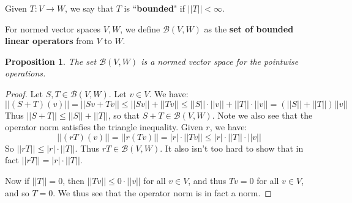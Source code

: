 \documentclass[a4paper,12pt]{report}
\newcommand{\ms}[1]{\mathscr{#1}}
\newtheorem{prop}[theorem]{Proposition}
\newenvironment{definition}[1][Definition.]{\begin{trivlist}
\item[\hskip \labelsep {\bfseries #1}]}{\end{trivlist}}
\begin{document}
	\begin{definition}
	Given $T : V \rightarrow W$, we say that $T$ is ``\textbf{bounded}" if $||T|| < \infty$. 
	\end{definition}
	
	\begin{definition}
	For normed vector spaces $V, W$, we define $\ms{B}(V, W)$ as the \textbf{set of bounded linear operators} from $V$ to $W$.
	\end{definition}
	
	\begin{prop}
	The set $\ms{B}(V, W)$ is a normed vector space for the pointwise operations. 
	\end{prop}
	\begin{proof}
	Let $S, T \in \ms{B}(V, W)$. Let $v \in V$. We have:
	\[ ||(S + T)(v)|| = ||Sv + Tv|| \leq ||Sv|| + ||Tv|| \leq ||S|| \cdot ||v|| + ||T|| \cdot ||v|| = (||S|| + ||T||)||v|| \]
	Thus $||S + T|| \leq ||S|| + ||T||$, so that $S + T \in \ms{B}(V, W)$. Note we also see that the operator norm satisfies the triangle inequality. Given $r$, we have:
	\[ ||(rT)(v)|| = ||r(Tv)|| = |r|\cdot||Tv|| \leq |r| \cdot ||T|| \cdot ||v|| \]
	So $||rT|| \leq |r| \cdot ||T||$. Thus $rT \in \ms{B}(V, W)$. It also isn't too hard to show that in fact $||rT|| = |r| \cdot ||T||$. 
	
	Now if $||T|| = 0$, then $||Tv|| \leq 0 \cdot ||v||$ for all $v \in V$, and thus $Tv = 0$ for all $v \in V$, and so $T = 0$. We thus see that the operator norm is in fact a norm. 
	\end{proof}
	
\end{document}
